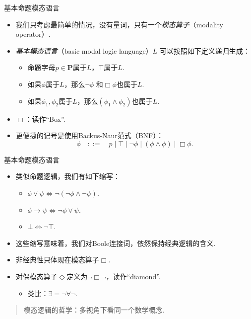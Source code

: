     \begin{frame}{基本命题模态语言}
    \begin{itemize}
        \item 我们只考虑最简单的情况，没有量词，只有一个\emph{模态算子}（modality operator）.
        \item \emph{基本模态语言}（basic modal logic language）$L$ 可以按照如下定义递归生成：
        \begin{itemize}
            \item 命题字母$p\in \mathbf P$属于$L$，$\top$属于$L$.
            \item 如果$\phi$属于$L$，那么$\neg\phi$ 和$\Box\phi$也属于$L$.
            \item 如果$\phi_1,\phi_2$属于$L$，那么$(\phi_1\wedge\phi_2)$也属于$L$.
        \end{itemize}
        \item $\Box$：读作“Box”.
        \item 更便捷的记号是使用Backus-Naur范式（BNF）：
        \[\phi\quad::=\quad p\mid \top\mid \neg\phi\mid (\phi\wedge\phi)\mid \Box\phi.\] 
    \end{itemize}
    \end{frame}
    \begin{frame}{基本命题模态语言}
    \begin{itemize}
        \item 类似命题逻辑，我们有如下缩写：
        \begin{itemize}
            \item $\phi\vee\psi\iff\neg(\neg \phi\wedge\neg\psi)$.
            \item $\phi\to\psi\iff\neg\phi\vee\psi$.
            \item $\bot\iff\neg\top$.
        \end{itemize}
        \item 这些缩写意味着，我们对Boole连接词，依然保持经典逻辑的含义.
        \item 非经典性只体现在模态算子$\Box$.
        \item 对偶模态算子$\Diamond$定义为$\neg\Box\neg$，读作“diamond”.
        \begin{itemize}
            \item 类比：$\exists=\neg\forall\neg$.
        \end{itemize}
    \end{itemize}
    \end{frame}
    \begin{frame}{}
        \begin{quotation}
        模态逻辑的哲学：多视角下看同一个数学概念.
        \end{quotation}
    \end{frame}
    
